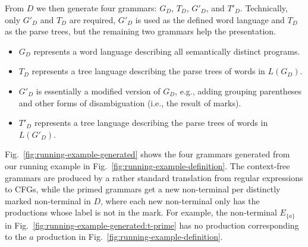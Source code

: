 \documentclass[runningheads]{llncs}
\begin{document}
From $D$ we then generate four grammars: $G_D$, $T_D$, $G'_D$, and $T'_D$. Technically, only $G'_D$ and $T_D$ are required, $G'_D$ is used as the defined word language and $T_D$ as the parse trees, but the remaining two grammars help the presentation.

\begin{itemize}
\item $G_D$ represents a word language describing all semantically distinct programs.
\item $T_D$ represents a tree language describing the parse trees of words in $L(G_D)$.
\item $G'_D$ is essentially a modified version of $G_D$, e.g., adding grouping parentheses and other forms of disambiguation (i.e., the result of marks).
\item $T'_D$ represents a tree language describing the parse trees of words in $L(G'_D)$.
\end{itemize}

\noindent Fig.~\ref{fig:running-example-generated} shows the four grammars generated from our running example in Fig.~\ref{fig:running-example-definition}. The context-free grammars are produced by a rather standard translation from regular expressions to CFGs, while the primed grammars get a new non-terminal per distinctly marked non-terminal in $D$, where each new non-terminal only has the productions whose label is not in the mark. For example, the non-terminal $E_{\{a\}}$ in Fig.~\ref{fig:running-example-generated:t-prime} has no production corresponding to the $a$ production in Fig.~\ref{fig:running-example-definition}.
\end{document}
